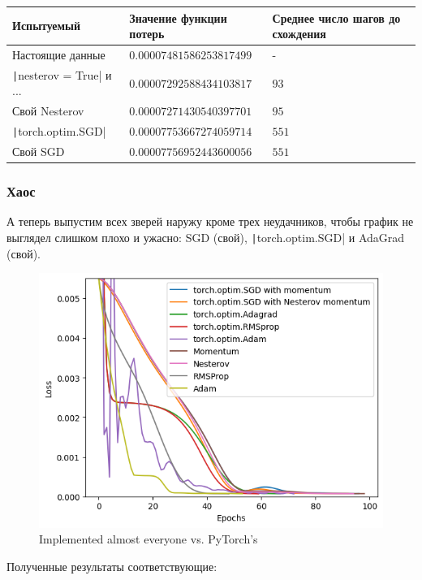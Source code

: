 \documentclass[12pt, a4paper, oneside, final]{article}
\begin{document}
	\begin{table}[H]
		\centering
		\begin{tabular}{l|l|l}
			Испытуемый & Значение функции потерь & Среднее число шагов до схождения \\ \hline
			Настоящие данные & $0.00007481586253817499$ & - \\
			\texttt|nesterov = True| и ... & $0.00007292588434103817$ & $93$ \\
			Свой Nesterov & $0.00007271430540397701$ & $95$ \\
			\texttt|torch.optim.SGD| & $0.00007753667274059714$ & $551$ \\
			Свой SGD & $0.00007756952443600056$ & $551$
		\end{tabular}
	\end{table}
	\subsubsection*{Хаос}
	А теперь выпустим всех зверей наружу кроме трех неудачников, чтобы график не выглядел слишком плохо и ужасно: SGD (свой), \texttt|torch.optim.SGD| и AdaGrad (свой).
	\begin{figure}[H]
		\centering
		\includegraphics[scale = 1]{Image/T1_CHAOS.png}
		\caption*{Implemented almost everyone vs. PyTorch's}
	\end{figure}
	Полученные результаты соответствующие:
\end{document}
